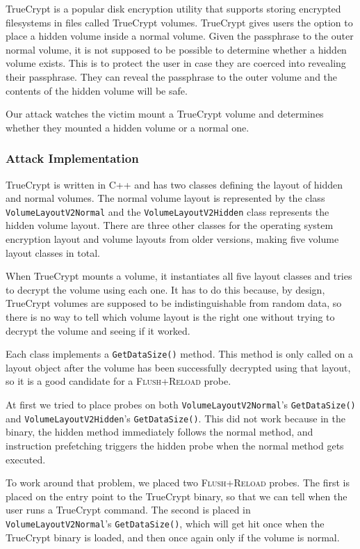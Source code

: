 \documentclass[letterpaper,twocolumn,10pt]{article}
\begin{document}
TrueCrypt is a popular disk encryption utility that supports storing encrypted
filesystems in files called TrueCrypt volumes. TrueCrypt gives users the option
to place a hidden volume inside a normal volume. Given the passphrase to the
outer normal volume, it is not supposed to be possible to determine whether
a hidden volume exists. This is to protect the user in case they are coerced
into revealing their passphrase. They can reveal the passphrase to the outer
volume and the contents of the hidden volume will be safe. 

Our attack watches the victim mount a TrueCrypt volume and determines whether
they mounted a hidden volume or a normal one.

\subsubsection{Attack Implementation}

TrueCrypt is written in C++ and has two classes defining the layout of hidden
and normal volumes. The normal volume layout is represented by the class
\texttt{VolumeLayoutV2Normal} and the \texttt{VolumeLayoutV2Hidden} class
represents the hidden volume layout. There are three other classes for the
operating system encryption layout and volume layouts from older versions,
making five volume layout classes in total.

When TrueCrypt mounts a volume, it instantiates all five layout classes and
tries to decrypt the volume using each one. It has to do this because, by
design, TrueCrypt volumes are supposed to be indistinguishable from random data,
so there is no way to tell which volume layout is the right one without trying
to decrypt the volume and seeing if it worked.

Each class implements a \texttt{GetDataSize()} method. This method is only
called on a layout object after the volume has been successfully decrypted using
that layout, so it is a good candidate for a \textsc{Flush+Reload} probe.

At first we tried to place probes on both \texttt{VolumeLayoutV2Normal}'s
\texttt{GetDataSize()} and \texttt{VolumeLayoutV2Hidden}'s
\texttt{GetDataSize()}. This did not work because in the binary, the hidden
method immediately follows the normal method, and instruction prefetching
triggers the hidden probe when the normal method gets executed.

To work around that problem, we placed two \textsc{Flush+Reload} probes. The
first is placed on the entry point to the TrueCrypt binary, so that we can tell
when the user runs a TrueCrypt command. The second is placed in
\texttt{VolumeLayoutV2Normal}'s \texttt{GetDataSize()}, which will get hit once
when the TrueCrypt binary is loaded, and then once again only if the volume is
normal.
\end{document}
